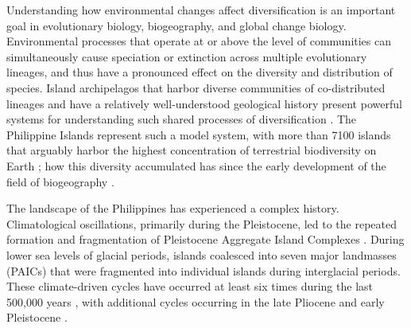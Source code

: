 
Understanding how environmental changes affect diversification is an important
goal in evolutionary biology, biogeography, and global change biology.
Environmental processes that operate at or above the level of communities can
simultaneously cause speciation or extinction across multiple evolutionary
lineages, and thus have a pronounced effect on the diversity and distribution
of species.
Island archipelagos that harbor diverse communities of co-distributed lineages
and have a relatively well-understood geological history present powerful
systems for understanding such shared processes of diversification
\citep{Gillespie2007,Losos2009,Vences2009,Rafe2013AREES}.
The Philippine Islands represent such a model system, with more than 7100
islands that arguably harbor the highest concentration of terrestrial
biodiversity on Earth
\citep{CatibogSinha2006,RafeDiesmos2009, Heaney1998,Rafe2013AREES};
how this diversity accumulated has  since the
early development of the field of biogeography
.

The landscape of the Philippines has experienced a complex history.
Climatological oscillations, primarily during the Pleistocene, led to the
repeated formation and fragmentation of Pleistocene Aggregate Island Complexes
\citep[PAICs;][]{Inger1954,Heaney1985,RafeDiesmos2001,RafeDiesmos2009,Esselstyn2009MPE,Siler2010,Rafe2013,Lomolino2016}.
During lower sea levels of glacial periods, islands coalesced into seven major
landmasses (PAICs) that were fragmented into individual islands during
interglacial periods.
These climate-driven cycles have occurred at least six times during the last
500,000 years \citep{Rohling1998,Siddall2003,Spratt2016}, with additional cycles
occurring in the late Pliocene and early Pleistocene
\citep{Haq1987,Miller2005}.

